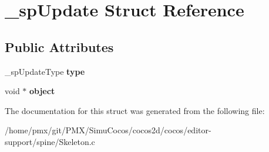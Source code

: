 \hypertarget{struct__spUpdate}{}\section{\+\_\+sp\+Update Struct Reference}
\label{struct__spUpdate}
\subsection*{Public Attributes}
\begin{DoxyCompactItemize}
\item 
\mbox{\label{struct__spUpdate_a597f498e1e64f144c78822294de535a3}} 
\+\_\+sp\+Update\+Type {\bfseries type}
\item 
\mbox{\label{struct__spUpdate_a68a57e0efb70447d661330574e415f6b}} 
void $\ast$ {\bfseries object}
\end{DoxyCompactItemize}


The documentation for this struct was generated from the following file\+:\begin{DoxyCompactItemize}
\item 
/home/pmx/git/\+P\+M\+X/\+Simu\+Cocos/cocos2d/cocos/editor-\/support/spine/Skeleton.\+c\end{DoxyCompactItemize}
